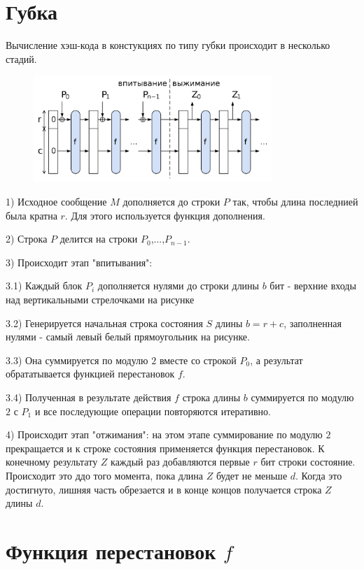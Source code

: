 \documentclass[a4paper,12pt]{article}
\theoremstyle{plain} %
\theoremstyle{definition} %
\theoremstyle{remark} %
\begin{document}
	\section{Губка} 
	
	Вычисление хэш-кода в констукциях по типу губки происходит в несколько стадий.
	
	\begin{figure}[h!]
		\centering
		\includegraphics[width=90mm]{2.png}
	\end{figure}

	1) Исходное сообщение $M$ дополняется до строки $P$ так, чтобы длина последнией была кратна $r$. Для этого используется функция дополнения.
	
	2) Строка $P$ делится на строки $P_0$,...,$P_{n-1}$.
	
	3) Происходит этап "впитывания":
	
	3.1) Каждый блок $P_i$ дополняется нулями до строки длины $b$ бит - верхние входы над вертикальными стрелочками на рисунке
	
	3.2) Генерируется начальная строка состояния $S$ длины $b=r+c$, заполненная нулями - самый левый белый прямоугольник на рисунке. 
	
	3.3) Она суммируется по модулю $2$ вместе со строкой $P_0$, а результат обрататывается функцией перестановок $f$.
	
	3.4) Полученная в результате действия $f$ строка длины $b$ суммируется по модулю $2$ с $P_1$ и все последующие операции повторяются итеративно. 
	
	4) Происходит этап "отжимания": на этом этапе суммирование по модулю $2$ прекращается и к строке состояния применяется функция перестановок. К конечному результату $Z$ каждый раз добавляются первые $r$ бит строки состояние. Происходит это ддо того момента, пока длина $Z$ будет не меньше $d$. Когда это достигнуто, лишняя часть обрезается и в конце концов получается строка $Z$ длины $d$.
	
	
	\newpage
	
	\section{Функция перестановок $f$}
\end{document}
